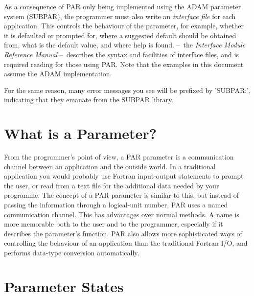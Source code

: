 \documentclass[twoside,11pt,nolof]{starlink}
\providecommand{\dash}{--}
\begin{document}
As a consequence of PAR only being implemented using the {\footnotesize
ADAM} parameter system (SUBPAR), the programmer must also write an \textit{interface file} for each application.  This controls the behaviour of
the parameter, for example, whether it is defaulted or prompted for,
where a suggested default should be obtained from, what is the default
value, and where help is found.
 \dash\ the \textit{Interface Module
Reference Manual\/} \dash\ describes the syntax and facilities of interface
files, and is required reading for those using PAR.  Note that the
examples in this document assume the {\footnotesize ADAM} implementation.

For the same reason, many error messages you see will be prefixed by 'SUBPAR:',
indicating that they emanate from the SUBPAR library.

\section{What is a Parameter?}

From the programmer's point of view, a PAR parameter is a communication
channel between an application and the outside world.  In a traditional
application you would probably use Fortran input-output statements to
prompt the user, or read from a text file for the additional data needed
by your programme.  The concept of a PAR parameter is similar to this,
but instead of passing the information through a logical-unit number,
PAR uses a named communication channel.  This has advantages over normal
methods.  A name is more memorable both to the user and to the
programmer, especially if it describes the parameter's function.  PAR
also allows more sophisticated ways of controlling the behaviour of an
application than the traditional Fortran I/O, and performs data-type
conversion automatically.

\section{Parameter States} \label{se:states}
\end{document}
